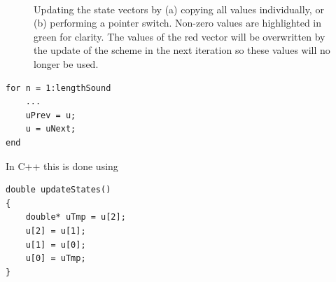 \begin{figure}[h]
    \\
    \caption{Updating the state vectors by (a) copying all values individually, or (b) performing a pointer switch. Non-zero values are highlighted in green for clarity. The values of the red vector will be overwritten by the update of the scheme in the next iteration so these values will no longer be used.}
\end{figure}


\setlstMAT
\begin{lstlisting}
for n = 1:lengthSound
    ...
    uPrev = u;
    u = uNext;
end
\end{lstlisting}



In C++ this is done using
\setlstCpp
\begin{lstlisting}[caption=Implementation of a pointer switch also shown in Figure \ref{fig:pointerSwitch}. A temporary pointer is assigned to where the $\u^{n-1}$ pointer is currently pointing at to be able to assign that location in memory to the $\u^{n+1}$ pointer in the end., label=lst:cppPointer]
double updateStates()
{
    double* uTmp = u[2];
    u[2] = u[1];
    u[1] = u[0];
    u[0] = uTmp;
}
\end{lstlisting}


